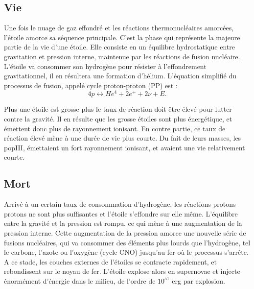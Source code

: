 \subsection{Vie}


Une fois le nuage de gaz effondré et les réactions thermonucléaires amorcées, l'étoile amorce sa séquence principale.
C'est la phase qui représente la majeure partie de la vie d'une étoile.
Elle consiste en un équilibre hydrostatique entre gravitation et pression interne, maintenue par les réactions de fusion nucléaire.
L'étoile va consommer son hydrogène pour résister à l'effondrement gravitationnel, il en résultera une formation d'hélium.
L'équation simplifié du processus de fusion, appelé cycle proton-proton (PP) est :
\begin{equation}
4p \leftrightarrow He^4 + 2e^+ + 2\nu + E.
\end{equation}

Plus une étoile est grosse plus le taux de réaction doit être élevé pour lutter contre la gravité.
Il en résulte que les grosse étoiles sont plus énergétique, et émettent donc plus de rayonnement ionisant.
En contre partie, ce taux de réaction élevé mène à une durée de vie plus courte.
Du fait de leurs masses, les popIII, émettaient un fort rayonnement ionisant, et avaient une vie relativement courte.


\subsection{Mort}
\label{sec:snmort}
Arrivé à un certain taux de consommation d'hydrogène, les réactions protons-protons ne sont plus suffisantes et l'étoile s'effondre sur elle même.
L'équilibre entre la gravité et la pression est rompu, ce qui mène à une augmentation de la pression interne.
Cette augmentation de la pression amorce une nouvelle série de fusions nucléaires, qui va consommer des éléments plus lourds que l’hydrogène, tel le carbone, l'azote ou l'oxygène (cycle CNO) jusqu'au fer où le processus s'arrête.
A ce stade, les couches externes de l'étoiles se contracte rapidement, et rebondissent sur le noyau de fer.
L'étoile explose alors en supernovae et injecte énormément d'énergie dans le milieu, de l'ordre de $10^{51}$ erg par explosion. 


